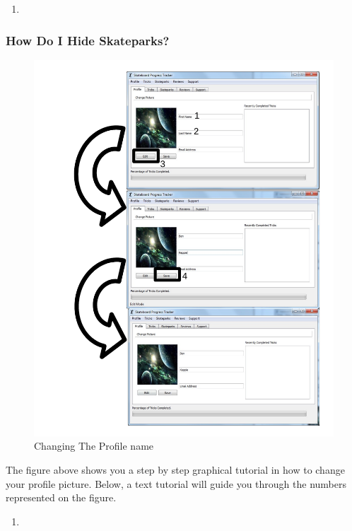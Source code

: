 \begin{enumerate}
\item
\end{enumerate}

\subsubsection{How Do I Hide Skateparks?} 

\begin{figure}[H]
    \includegraphics[width=\textwidth]{./Manual/Images/ChangeName.pdf}
    \caption{Changing The Profile name} \label{fig:Change Name}
\end{figure}

The figure above shows you a step by step graphical tutorial in how to change your profile picture. Below, a text tutorial will guide you through the numbers represented on the figure.

\begin{enumerate}
\item
\end{enumerate}


